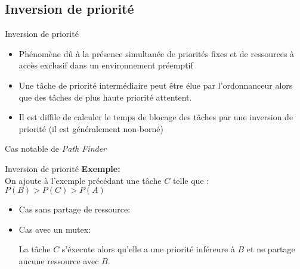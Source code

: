 \subsection{Inversion de priorité}

\begin{frame}{Inversion de priorité}
  \begin{itemize} 
  \item Phénomène dû à la présence simultanée de priorités fixes et de
    ressources à accès exclusif dans un environnement préemptif
  \item  Une  tâche  de  priorité  intermédiaire peut  être  élue  par
    l'ordonnanceur  alors  que  des  tâches  de  plus  haute  priorité
    attentent.
  \item Il est diffile de calculer  le temps de blocage des tâches par
    une inversion de priorité (il est généralement non-borné)
  \end{itemize} 
  Cas notable de \emph{Path Finder}
\end{frame}

\begin{frame}{Inversion de priorité}
  \textbf{Exemple:}\\
  On ajoute à l'exemple précédant une  tâche $C$ telle que : 
  $P(B) > P(C) > P(A)$
  \begin{itemize} 
  \item   Cas sans partage de ressource:
    \begin{center}
    \end{center}
  \item   Cas avec un mutex:
    \begin{center}
    \end{center}
    La tâche  $C$ s'éxecute alors  qu'elle a une priorité  inféreure à
    $B$ et ne partage aucune ressource avec $B$.
  \end{itemize} 
\end{frame} 

